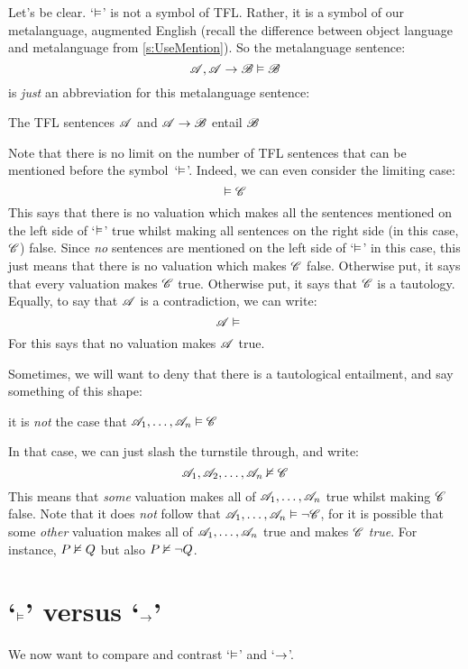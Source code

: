 Let's be clear. `$\vDash$' is not a symbol of TFL. Rather, it is a symbol of our metalanguage, augmented English (recall the difference between object language and metalanguage from \cref{s:UseMention}). So the metalanguage sentence:
	\[\mathscr{A}, \mathscr{A} \rightarrow \mathscr{B} \vDash \mathscr{B}\]
is \emph{just} an abbreviation for this metalanguage sentence: 
	\begin{center}
		The TFL sentences $\mathscr{A}$ and $\mathscr{A} \rightarrow \mathscr{B}$ entail $\mathscr{B}$
	\end{center}
Note that there is no limit on the number of TFL sentences that can be mentioned before the symbol~`$\vDash$'. Indeed, we can even consider the limiting case:
	$$\vDash \mathscr{C}$$
This says that there is no valuation which makes all the sentences
mentioned on the left side of `$\vDash$' true whilst making all
sentences on the right side (in this case, $\mathscr{C}$) false. Since \emph{no} sentences are mentioned on the left
side of `$\vDash$' in this case, this just means that there is no
valuation which makes $\mathscr{C}$ false. Otherwise put, it says that
every valuation makes $\mathscr{C}$ true. Otherwise put, it says that
$\mathscr{C}$ is a tautology. Equally, to say that $\mathscr{A}$ is a
contradiction, we can write:
	$$\metav{A} \entails\phantom{\metav{C}}$$
For this says that no valuation makes $\mathscr{A}$ true.

Sometimes, we will want to deny that there is a tautological entailment, and say something of this shape: 
\begin{center}
	it is \emph{not} the case that $\mathscr{A}_1, \ldots, \mathscr{A}_n \vDash \mathscr{C}$
\end{center}
In that case, we can just slash the turnstile through, and write: 
$$\mathscr{A}_1, \mathscr{A}_2, \ldots, \mathscr{A}_n \nvDash\mathscr{C}$$
This means that \emph{some} valuation makes all of $\mathscr{A}_1,
\ldots, \mathscr{A}_n$ true whilst making $\mathscr{C}$ false. Note that
it does \emph{not} follow that $\mathscr{A}_1,\ldots, \mathscr{A}_n
\vDash \neg \mathscr{C}$, for it is possible that some \emph{other}
valuation makes all of $\mathscr{A}_1, \ldots, \mathscr{A}_n$ true and
makes $\mathscr{C}$ \emph{true}. For instance, $P \nvDash Q$ but also
$P \nvDash \neg Q$.

\section{`$\vDash$' versus `$\rightarrow$'}\label{entails-v-iff}
We now want to compare and contrast `$\vDash$' and `$\rightarrow$'.

